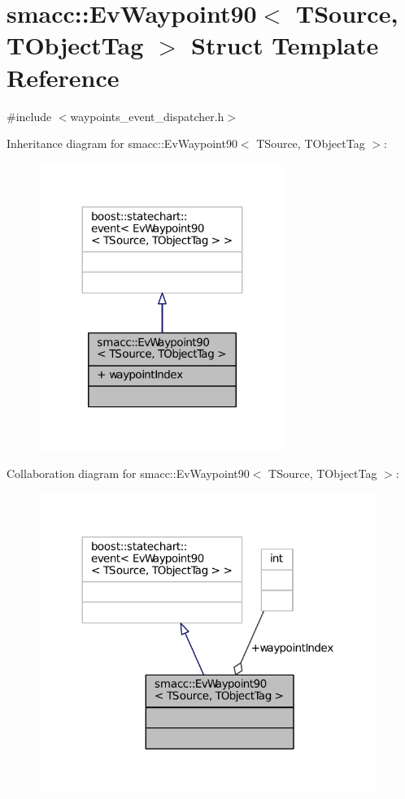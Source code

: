 \hypertarget{structsmacc_1_1EvWaypoint90}{}\section{smacc\+:\+:Ev\+Waypoint90$<$ T\+Source, T\+Object\+Tag $>$ Struct Template Reference}
\label{structsmacc_1_1EvWaypoint90}


{\ttfamily \#include $<$waypoints\+\_\+event\+\_\+dispatcher.\+h$>$}



Inheritance diagram for smacc\+:\+:Ev\+Waypoint90$<$ T\+Source, T\+Object\+Tag $>$\+:
\nopagebreak
\begin{figure}[H]
\begin{center}
\leavevmode
\includegraphics[width=227pt]{structsmacc_1_1EvWaypoint90__inherit__graph}
\end{center}
\end{figure}


Collaboration diagram for smacc\+:\+:Ev\+Waypoint90$<$ T\+Source, T\+Object\+Tag $>$\+:
\nopagebreak
\begin{figure}[H]
\begin{center}
\leavevmode
\includegraphics[width=312pt]{structsmacc_1_1EvWaypoint90__coll__graph}
\end{center}
\end{figure}
